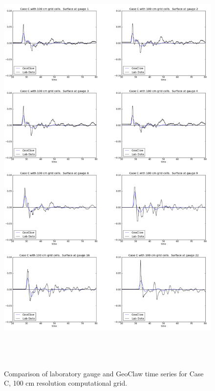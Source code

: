 \begin{figure}[ht]
\hfil\includegraphics[height=8.5in]{bp6/C100Gages.png}\hfil
\caption{\label{C100Gages}
Comparison of laboratory gauge and GeoClaw time series for Case C, 100 cm resolution computational grid.
  }
\end{figure}

